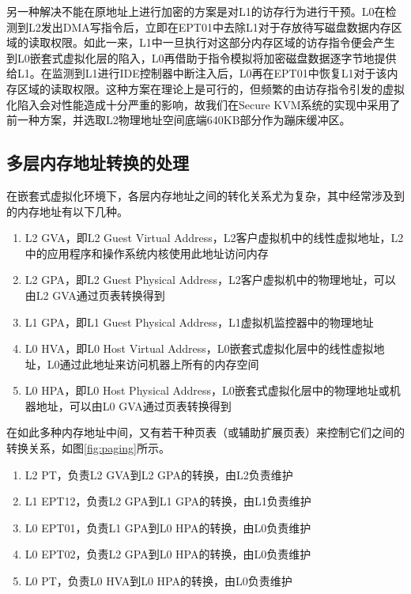 另一种解决不能在原地址上进行加密的方案是对L1的访存行为进行干预。L0在检测到L2发出DMA写指令后，立即在EPT01中去除L1对于存放待写磁盘数据内存区域的读取权限。如此一来，L1中一旦执行对这部分内存区域的访存指令便会产生到L0嵌套式虚拟化层的陷入，L0再借助于指令模拟将加密磁盘数据逐字节地提供给L1。在监测到L1进行IDE控制器中断注入后，L0再在EPT01中恢复L1对于该内存区域的读取权限。这种方案在理论上是可行的，但频繁的由访存指令引发的虚拟化陷入会对性能造成十分严重的影响，故我们在Secure KVM系统的实现中采用了前一种方案，并选取L2物理地址空间底端640KB部分作为蹦床缓冲区。

\subsection{多层内存地址转换的处理}

在嵌套式虚拟化环境下，各层内存地址之间的转化关系尤为复杂，其中经常涉及到的内存地址有以下几种。

\begin{enumerate}
\item L2 GVA，即L2 Guest Virtual Address，L2客户虚拟机中的线性虚拟地址，L2中的应用程序和操作系统内核使用此地址访问内存
\item L2 GPA，即L2 Guest Physical Address，L2客户虚拟机中的物理地址，可以由L2 GVA通过页表转换得到
\item L1 GPA，即L1 Guest Physical Address，L1虚拟机监控器中的物理地址
\item L0 HVA，即L0 Host Virtual Address，L0嵌套式虚拟化层中的线性虚拟地址，L0通过此地址来访问机器上所有的内存空间
\item L0 HPA，即L0 Host Physical Address，L0嵌套式虚拟化层中的物理地址或机器地址，可以由L0 GVA通过页表转换得到
\end{enumerate}

在如此多种内存地址中间，又有若干种页表（或辅助扩展页表）来控制它们之间的转换关系，如图\ref{fig:paging}所示。

\begin{enumerate}
\item L2 PT，负责L2 GVA到L2 GPA的转换，由L2负责维护
\item L1 EPT12，负责L2 GPA到L1 GPA的转换，由L1负责维护
\item L0 EPT01，负责L1 GPA到L0 HPA的转换，由L0负责维护
\item L0 EPT02，负责L2 GPA到L0 HPA的转换，由L0负责维护
\item L0 PT，负责L0 HVA到L0 HPA的转换，由L0负责维护
\end{enumerate}

